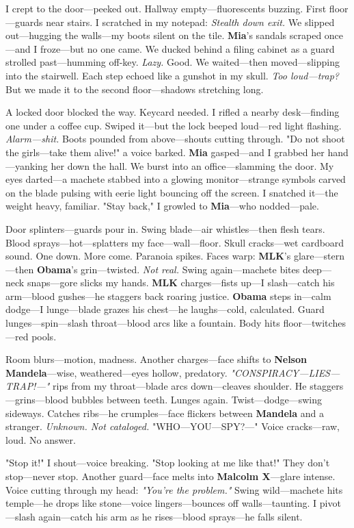\documentclass{article}
\begin{document}
I crept to the door—peeked out. Hallway empty—fluorescents buzzing. First floor—guards near stairs. I scratched in my notepad: \textit{Stealth down exit.} We slipped out—hugging the walls—my boots silent on the tile. \textbf{Mia}’s sandals scraped once—and I froze—but no one came. We ducked behind a filing cabinet as a guard strolled past—humming off-key. \textit{Lazy.} Good. We waited—then moved—slipping into the stairwell. Each step echoed like a gunshot in my skull. \textit{Too loud—trap?} But we made it to the second floor—shadows stretching long.

A locked door blocked the way. Keycard needed. I rifled a nearby desk—finding one under a coffee cup. Swiped it—but the lock beeped loud—red light flashing. \textit{Alarm—shit.} Boots pounded from above—shouts cutting through. "Do not shoot the girls—take them alive!" a voice barked. \textbf{Mia} gasped—and I grabbed her hand—yanking her down the hall. We burst into an office—slamming the door. My eyes darted—a machete stabbed into a glowing monitor—strange symbols carved on the blade pulsing with eerie light bouncing off the screen. I snatched it—the weight heavy, familiar. "Stay back," I growled to \textbf{Mia}—who nodded—pale.

Door splinters—guards pour in. Swing blade—air whistles—then flesh tears. Blood sprays—hot—splatters my face—wall—floor. Skull cracks—wet cardboard sound. One down. More come. Paranoia spikes. Faces warp: \textbf{MLK}’s glare—stern—then \textbf{Obama}’s grin—twisted. \textit{Not real.} Swing again—machete bites deep—neck snaps—gore slicks my hands. \textbf{MLK} charges—fists up—I slash—catch his arm—blood gushes—he staggers back roaring justice. \textbf{Obama} steps in—calm dodge—I lunge—blade grazes his chest—he laughs—cold, calculated. Guard lunges—spin—slash throat—blood arcs like a fountain. Body hits floor—twitches—red pools.

Room blurs—motion, madness. Another charges—face shifts to \textbf{Nelson Mandela}—wise, weathered—eyes hollow, predatory. \textit{"CONSPIRACY—LIES—TRAP!—"} rips from my throat—blade arcs down—cleaves shoulder. He staggers—grins—blood bubbles between teeth. Lunges again. Twist—dodge—swing sideways. Catches ribs—he crumples—face flickers between \textbf{Mandela} and a stranger. \textit{Unknown. Not cataloged.} "WHO—YOU—SPY?—" Voice cracks—raw, loud. No answer.

"Stop it!" I shout—voice breaking. "Stop looking at me like that!" They don’t stop—never stop. Another guard—face melts into \textbf{Malcolm X}—glare intense. Voice cutting through my head: \textit{"You’re the problem."} Swing wild—machete hits temple—he drops like stone—voice lingers—bounces off walls—taunting. I pivot—slash again—catch his arm as he rises—blood sprays—he falls silent.
\end{document}
